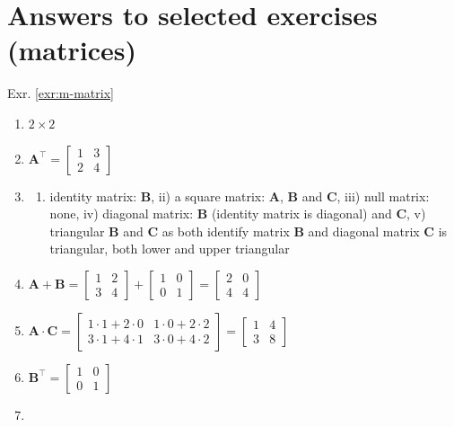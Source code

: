 \documentclass[
]{book}
\providecommand{\tightlist}{%
  \setlength{\itemsep}{0pt}\setlength{\parskip}{0pt}}
\theoremstyle{definition}
\theoremstyle{definition}
\theoremstyle{definition}
\theoremstyle{remark}
\begin{document}
\hypertarget{answers-to-selected-exercises-matrices}{%
\section*{Answers to selected exercises (matrices)}\label{answers-to-selected-exercises-matrices}}

Exr. \ref{exr:m-matrix}

\begin{enumerate}
\def\labelenumi{\alph{enumi})}
\item
  \(2 \times 2\)
\item
  \(\mathbf{A}^\top = \begin{bmatrix}  1 & 3 \\  2 & 4  \end{bmatrix}\)
\item
  \begin{enumerate}
  \def\labelenumii{\roman{enumii})}
  \tightlist
  \item
    identity matrix: \(\mathbf{B}\), ii) a square matrix: \(\mathbf{A}\), \(\mathbf{B}\) and \(\mathbf{C}\), iii) null matrix: none, iv) diagonal matrix: \(\mathbf{B}\) (identity matrix is diagonal) and \(\mathbf{C}\), v) triangular \(\mathbf{B}\) and \(\mathbf{C}\) as both identify matrix \(\mathbf{B}\) and diagonal matrix \(\mathbf{C}\) is triangular, both lower and upper triangular
  \end{enumerate}
\item
  \(\mathbf{A} + \mathbf{B} = \begin{bmatrix}  1 & 2 \\  3 & 4  \end{bmatrix} + \begin{bmatrix}  1 & 0 \\  0 & 1  \end{bmatrix} = \begin{bmatrix}  2 & 0 \\  4 & 4  \end{bmatrix}\)
\item
  \(\mathbf{A} \cdot \mathbf{C} = \begin{bmatrix}  1 \cdot 1 + 2 \cdot 0 & 1 \cdot 0 + 2 \cdot 2 \\  3 \cdot 1 + 4 \cdot 1 & 3 \cdot 0 + 4 \cdot 2  \end{bmatrix} = \begin{bmatrix}  1 & 4 \\  3 & 8  \end{bmatrix}\)
\item
  \(\mathbf{B}^\top = \begin{bmatrix}  1 & 0 \\  0 & 1  \end{bmatrix}\)
\item
\end{enumerate}
\end{document}
